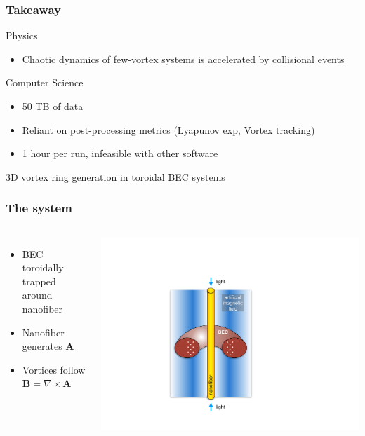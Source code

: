 \documentclass{beamer}
\begin{document}
\begin{frame}
\frametitle{Takeaway}
Physics
\begin{itemize}
\item Chaotic dynamics of few-vortex systems is accelerated by collisional events
\end{itemize}
Computer Science
\begin{itemize}
\item 50 TB of data
\item Reliant on post-processing metrics (Lyapunov exp, Vortex tracking)
\item 1 hour per run, infeasible with other software
\end{itemize}
\end{frame}

\begin{frame}
\center \huge 3D vortex ring generation in toroidal BEC systems
\end{frame}

\begin{frame}
\frametitle{The system}

\begin{columns}

\begin{itemize}
\item BEC toroidally trapped around nanofiber
\item Nanofiber generates $\mathbf{A}$
\item Vortices follow $\mathbf{B} = \nabla \times \mathbf{A}$
\end{itemize}

\includegraphics[width=\textwidth]{../data/3d/Schematic_TB}
\end{columns}

\end{frame}
\end{document}
